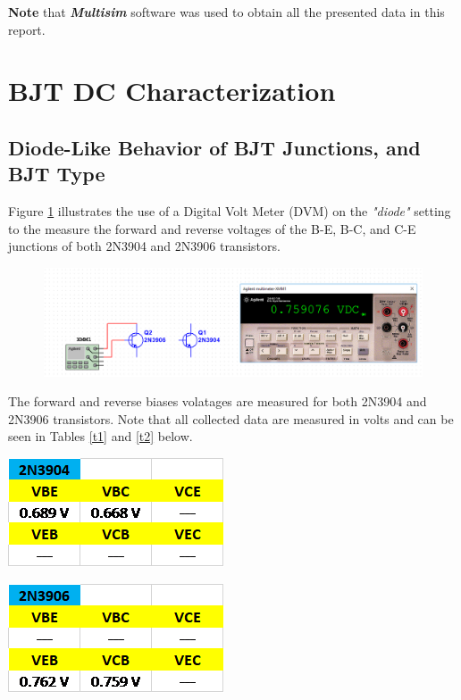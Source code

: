 \documentclass{article}
\begin{document}
	\vspace{2cm}	
	\noindent \textbf{Note} that \textbf{\textit{Multisim}} software was used to obtain all the presented data in this report.
	
	\pagebreak
	
	\section{BJT DC Characterization}
	\subsection{Diode-Like Behavior of BJT Junctions, and BJT Type}
	Figure \ref{f4} illustrates the use of a Digital Volt Meter (DVM) on the \textit{"diode"} setting to the measure the forward and reverse voltages of the B-E, B-C, and C-E junctions of both 2N3904 and 2N3906 transistors. 
	
	\begin{figure}[!ht]
		\centering
		\includegraphics[width=\linewidth]{d1-part1.png}
		\label{f4}
	\end{figure}

	\noindent The forward and reverse biases volatages are measured for both 2N3904 and 2N3906 transistors.
	Note that all collected data are measured in volts and can be seen in Tables \ref{t1} and \ref{t2} below.
	
	\begin{table}[!ht]
		\centering
		\label{t1}
		\includegraphics[width=0.4\linewidth]{d1-part1.1.png}
	\end{table}
	
	\begin{table}[!ht]
		\centering
		\label{t2}
		\includegraphics[width=0.4\linewidth]{d1-part1.2.png}
	\end{table}
\end{document}

